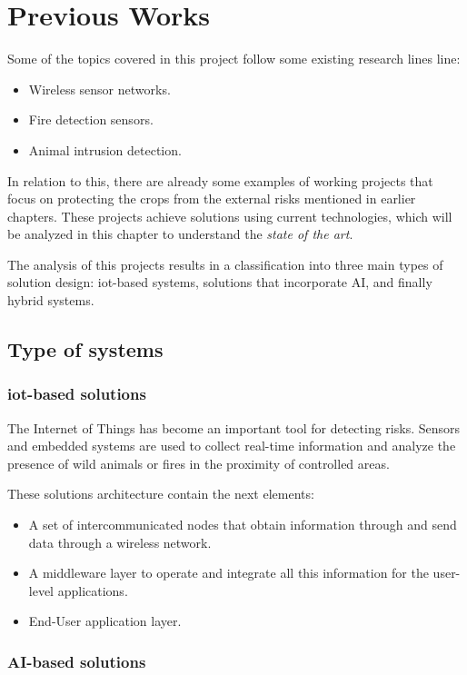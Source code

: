 \section{Previous Works}

Some of the topics covered in this project follow some existing research lines line:
\begin{itemize}
    \item Wireless sensor networks.
    \item Fire detection sensors.
    \item Animal intrusion detection.
\end{itemize}

In relation to this, there are already some examples of working projects that focus on 
protecting the crops from the external risks mentioned in earlier chapters. These projects achieve solutions 
using current technologies, which will be analyzed in this chapter to understand the \textit{state of the art}. 

The analysis of this projects results in a classification into three main types of solution design: \acrshort{iot}-based systems, 
solutions that incorporate AI, and finally hybrid systems.

\subsection{Type of systems}
\subsubsection*{\acrshort{iot}-based solutions}

The Internet of Things has become an important tool for detecting risks. Sensors and embedded systems are used 
to collect real-time information and analyze the presence of wild animals or fires in the proximity of controlled areas.

These solutions architecture contain the next elements:
\begin{itemize}
    \item A set of intercommunicated nodes that obtain information through and send data through a wireless network.
    \item A middleware layer to operate and integrate all this information for the user-level applications.
    \item End-User application layer.
\end{itemize}

\subsubsection*{AI-based solutions}

